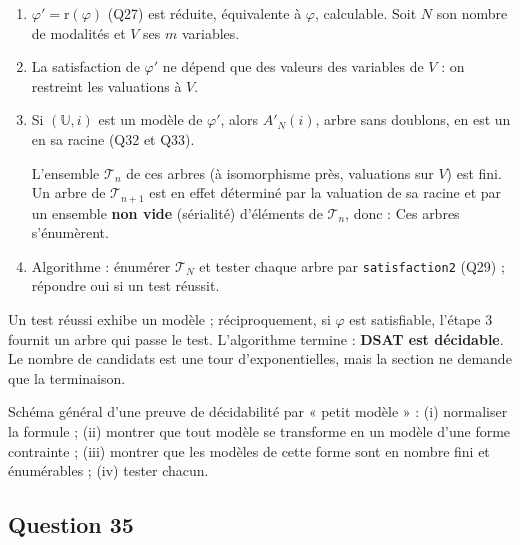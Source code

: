 \documentclass[11pt,a4paper]{article}
\newcommand{\equationajustee}[1]{%
  \sbox{\boiteequation}{$\displaystyle #1$}%
  \ifdim\wd\boiteequation>\linewidth
    \[\resizebox{\linewidth}{!}{\usebox{\boiteequation}}\]%
  \else
    \[#1\]%
  \fi}
\begin{document}
\begin{enumerate}
\def\labelenumi{\arabic{enumi}.}
\item
  \(\varphi'=\mathrm r(\varphi)\) (Q27) est réduite, équivalente à \(\varphi\), calculable. Soit \(N\) son nombre de modalités et \(V\) ses \(m\) variables.
\item
  La satisfaction de \(\varphi'\) ne dépend que des valeurs des variables de \(V\) : on restreint les valuations à \(V\).
\item
  Si \((\mathbb U,i)\) est un modèle de \(\varphi'\), alors \(A'_N(i)\), arbre sans doublons, en est un en sa racine (Q32 et Q33).

  L'ensemble \(\mathcal T_n\) de ces arbres (à isomorphisme près, valuations sur \(V\)) est fini. Un arbre de \(\mathcal T_{n+1}\) est en effet déterminé par la valuation de sa racine et par un ensemble \textbf{non vide} (sérialité) d'éléments de \(\mathcal T_n\), donc :
  \equationajustee{
  \begin{aligned}
  |\mathcal T_0|&=2^m\\
  |\mathcal T_{n+1}|&=2^m(2^{|\mathcal T_n|}-1)
  \end{aligned}
  }
  Ces arbres s'énumèrent.
\item
  Algorithme : énumérer \(\mathcal T_N\) et tester chaque arbre par \texttt{satisfaction2} (Q29) ; répondre oui si un test réussit.
\end{enumerate}

Un test réussi exhibe un modèle ; réciproquement, si \(\varphi\) est satisfiable, l'étape 3 fournit un arbre qui passe le test. L'algorithme termine : \textbf{DSAT est décidable}. Le nombre de candidats est une tour d'exponentielles, mais la section ne demande que la terminaison.

\begin{methode}

Schéma général d'une preuve de décidabilité par « petit modèle » : (i) normaliser la formule ; (ii) montrer que tout modèle se transforme en un modèle d'une forme contrainte ; (iii) montrer que les modèles de cette forme sont en nombre fini et énumérables ; (iv) tester chacun.

\end{methode}

\hypertarget{question-35}{%
\subsection{Question 35}\label{question-35}}
\end{document}
